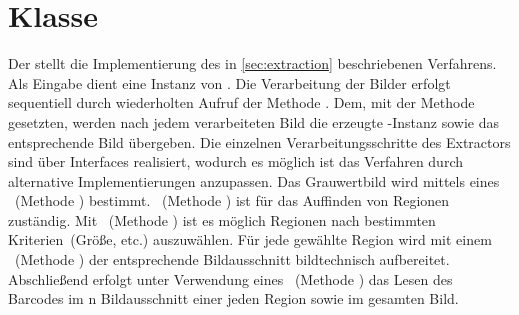 \section{Klasse }
Der  stellt die Implementierung des in \autoref{sec:extraction} beschriebenen Verfahrens.
Als Eingabe dient eine Instanz von .
Die Verarbeitung der Bilder erfolgt sequentiell durch wiederholten Aufruf der Methode .
Dem, mit der Methode  gesetzten,  werden nach jedem verarbeiteten Bild die erzeugte -Instanz sowie das entsprechende Bild übergeben.
\noindent
Die einzelnen Verarbeitungsschritte des Extractors sind über Interfaces realisiert, wodurch es möglich ist das Verfahren durch alternative Implementierungen anzupassen.
Das Grauwertbild wird mittels eines ~(Methode ) bestimmt.
~(Methode ) ist für das Auffinden von Regionen zuständig.
Mit ~(Methode ) ist es möglich Regionen nach bestimmten Kriterien~(Größe, etc.) auszuwählen.
Für jede gewählte Region wird mit einem ~(Methode ) der entsprechende Bildausschnitt bildtechnisch aufbereitet.
Abschließend erfolgt unter Verwendung eines ~(Methode ) das Lesen des Barcodes im n Bildausschnitt einer jeden Region sowie im gesamten Bild.






